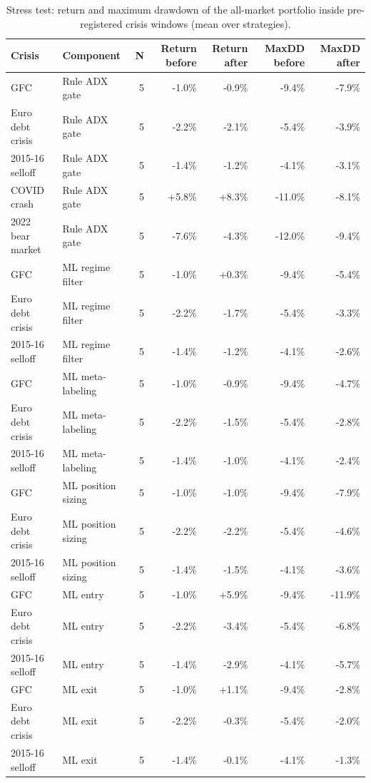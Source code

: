 \begin{longtable}{l l r r r r r}
\caption{Stress test: return and maximum drawdown of the all-market portfolio inside pre-registered crisis windows (mean over strategies).} \label{tab:s2crisis} \\
\toprule
Crisis & Component & N & Return before & Return after & MaxDD before & MaxDD after \\
\midrule
\endhead
\bottomrule
\endfoot
GFC & Rule ADX gate & 5 & -1.0\% & -0.9\% & -9.4\% & -7.9\% \\
Euro debt crisis & Rule ADX gate & 5 & -2.2\% & -2.1\% & -5.4\% & -3.9\% \\
2015-16 selloff & Rule ADX gate & 5 & -1.4\% & -1.2\% & -4.1\% & -3.1\% \\
COVID crash & Rule ADX gate & 5 & +5.8\% & +8.3\% & -11.0\% & -8.1\% \\
2022 bear market & Rule ADX gate & 5 & -7.6\% & -4.3\% & -12.0\% & -9.4\% \\
GFC & ML regime filter & 5 & -1.0\% & +0.3\% & -9.4\% & -5.4\% \\
Euro debt crisis & ML regime filter & 5 & -2.2\% & -1.7\% & -5.4\% & -3.3\% \\
2015-16 selloff & ML regime filter & 5 & -1.4\% & -1.2\% & -4.1\% & -2.6\% \\
GFC & ML meta-labeling & 5 & -1.0\% & -0.9\% & -9.4\% & -4.7\% \\
Euro debt crisis & ML meta-labeling & 5 & -2.2\% & -1.5\% & -5.4\% & -2.8\% \\
2015-16 selloff & ML meta-labeling & 5 & -1.4\% & -1.0\% & -4.1\% & -2.4\% \\
GFC & ML position sizing & 5 & -1.0\% & -1.0\% & -9.4\% & -7.9\% \\
Euro debt crisis & ML position sizing & 5 & -2.2\% & -2.2\% & -5.4\% & -4.6\% \\
2015-16 selloff & ML position sizing & 5 & -1.4\% & -1.5\% & -4.1\% & -3.6\% \\
GFC & ML entry & 5 & -1.0\% & +5.9\% & -9.4\% & -11.9\% \\
Euro debt crisis & ML entry & 5 & -2.2\% & -3.4\% & -5.4\% & -6.8\% \\
2015-16 selloff & ML entry & 5 & -1.4\% & -2.9\% & -4.1\% & -5.7\% \\
GFC & ML exit & 5 & -1.0\% & +1.1\% & -9.4\% & -2.8\% \\
Euro debt crisis & ML exit & 5 & -2.2\% & -0.3\% & -5.4\% & -2.0\% \\
2015-16 selloff & ML exit & 5 & -1.4\% & -0.1\% & -4.1\% & -1.3\% \\

\end{longtable}

